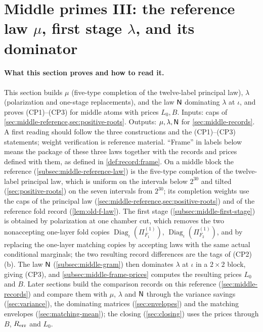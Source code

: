 
\section{Middle primes III: the reference law \texorpdfstring{$\mu$}{mu}, first stage \texorpdfstring{$\lambda$}{lambda}, and its dominator}
\label{sec:middle-frame}

\paragraph{What this section proves and how to read it.}
This section builds $\mu$ (five-type completion of the
twelve-label principal law), $\lambda$ (polarization and one-stage
replacements), and the law $\mathsf N$ dominating $\lambda$ at $\iota$,
and proves (CP1)--(CP3) for middle atoms with prices $L_0,B$.
Inputs: caps of \cref{sec:middle-reference,sec:positive-roots}.
Outputs: $\mu,\lambda,\mathsf N$ for \cref{sec:middle-records}. A first
reading should follow the three constructions and the (CP1)--(CP3)
statements; weight verification is reference material.
``Frame'' in labels below means the package of these three laws together with the records and prices defined with them, as
defined in \cref{def:record:frame}. On a middle block the
reference (\cref{subsec:middle-reference-law}) is the five-type
completion of the twelve-label principal law, which is uniform on
the intervals below $2^{30}$ and tilted
(\cref{sec:positive-roots}) on the seven intervals from $2^{30}$;
its completion weights use the caps of the principal law
(\cref{sec:middle-reference,sec:positive-roots}) and of the
reference fold record (\cref{lem:old-f-law}). The first stage
(\cref{subsec:middle-first-stage}) is obtained by polarization at
one chamber cut, which removes the two nonaccepting one-layer
fold copies $\operatorname{Diag}_\iota(\Pi^{(1)}_{F_1})$,
$\operatorname{Diag}_\iota(\Pi^{(1)}_{F_2})$, and by replacing the
one-layer matching copies by accepting laws with the same actual
conditional marginals; the two resulting record differences are
the tags of (CP2)(b). The law $\mathsf N$
(\cref{subsec:middle-gram}) then dominates $\lambda$ at $\iota$ in
a $2\times2$ block, giving (CP3), and
\cref{subsec:middle-frame-prices} computes the resulting prices
$L_0$ and $B$. Later sections build the comparison records on
this reference (\cref{sec:middle-records}) and compare them with
$\mu$, $\lambda$ and $\mathsf N$ through the variance savings
(\cref{sec:variance}), the dominating matrices
(\cref{sec:envelopes}) and the matching envelopes
(\cref{sec:matching-mean}); the closing
(\cref{sec:closing}) uses the prices through $B$, $R_{\rm err}$
and $L_0$.

